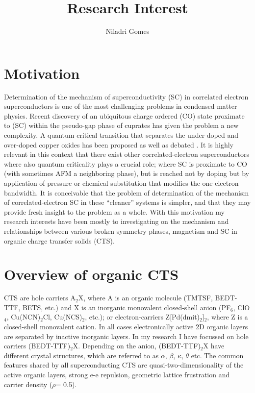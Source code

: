 \documentclass[a4paper,12pt]{article}
\title{\vspace{-2cm}Research Interest}
\author{Niladri Gomes}
\begin{document}
\maketitle



\section{Motivation}
Determination of the mechanism of superconductivity (SC) in correlated electron superconductors is one of the most challenging 
problems in condensed matter physics. Recent discovery of an ubiquitous charge ordered (CO) state proximate to (SC) within the 
pseudo-gap phase of cuprates \cite{ghiringhelli12a,chang12a,comin14a,wu13a} has given the problem a new complexity. A quantum critical
transition that separates the under-doped and over-doped copper oxides has been proposed as well as debated \cite{lee06a,anderson04a,scalapino12a}. It is highly relevant in this context that there exist
other correlated-electron superconductors where also quantum criticality plays a crucial role; where SC is
proximate to CO (with sometimes AFM a neighboring phase), but is reached not by doping but by application
of pressure or chemical substitution that modifies the one-electron bandwidth. It is conceivable that the
problem of determination of the mechanism of correlated-electron SC in these “cleaner” systems is simpler,
and that they may provide fresh insight to the problem as a whole. With this motivation my research interests have 
been mostly to investigating on the mechanism and relationships between various broken symmetry phases, 
magnetism and SC in organic charge transfer solids (CTS).  

\section{Overview of organic CTS}
CTS are hole carriers A$_{2}$X, where A is an organic molecule (TMTSF, BEDT-TTF, BETS, etc.) and X is
an inorganic monovalent closed-shell anion (PF$_{6}$, ClO$_{4}$, Cu(NCN)$_{2}$Cl, Cu(NCS)$_{2}$, etc.); or electron-carriers
Z[Pd(dmit)$_{2}$]$_{2}$, where Z is a closed-shell monovalent cation. In all cases electronically active 2D organic
layers are separated by inactive inorganic layers. In my research I have focussed on hole carriers (BEDT-TTF)$_{2}$X. Depending
on the anion, (BEDT-TTF)$_{2}$X have different crystal structures, which are referred to as $\alpha$, $\beta$, $\kappa$, $\theta$ etc. 
The common features shared by all superconducting CTS are quasi-two-dimensionality of
the active organic layers, strong e-e repulsion, geometric lattice frustration and carrier density ($\rho$= 0.5).
\end{document}
